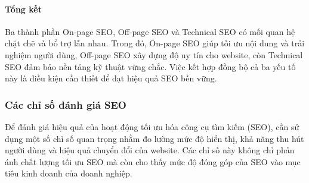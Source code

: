 \documentclass[13pt]{article}
\begin{document}
\paragraph{Tổng kết}
Ba thành phần On-page SEO, Off-page SEO và Technical SEO có mối quan hệ chặt chẽ và bổ trợ lẫn nhau. Trong đó, On-page SEO giúp tối ưu nội dung và trải nghiệm người dùng, Off-page SEO xây dựng độ uy tín cho website, còn Technical SEO đảm bảo nền tảng kỹ thuật vững chắc. Việc kết hợp đồng bộ cả ba yếu tố này là điều kiện cần thiết để đạt hiệu quả SEO bền vững.
\subsubsection{Các chỉ số đánh giá SEO}

Để đánh giá hiệu quả của hoạt động tối ưu hóa công cụ tìm kiếm (SEO), cần sử dụng một số chỉ số quan trọng nhằm đo lường mức độ hiển thị, khả năng thu hút người dùng và hiệu quả chuyển đổi của website. Các chỉ số này không chỉ phản ánh chất lượng tối ưu SEO mà còn cho thấy mức độ đóng góp của SEO vào mục tiêu kinh doanh của doanh nghiệp.
\end{document}
